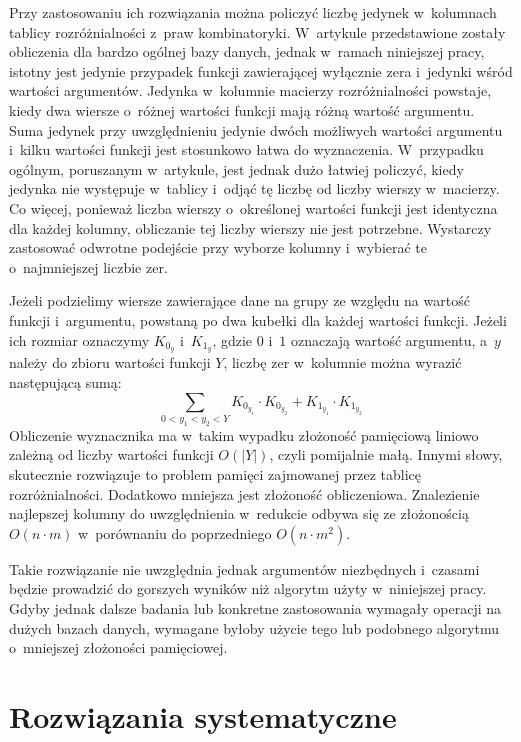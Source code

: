 Przy zastosowaniu ich rozwiązania można policzyć liczbę jedynek w~kolumnach tablicy rozróżnialności z~praw kombinatoryki.
W~artykule przedstawione zostały obliczenia dla bardzo ogólnej bazy danych,
jednak w~ramach niniejszej pracy,
istotny jest jedynie przypadek funkcji zawierającej wyłącznie zera i~jedynki wśród wartości argumentów.
Jedynka w~kolumnie macierzy rozróżnialności powstaje,
kiedy dwa wiersze o~różnej wartości funkcji mają różną wartość argumentu.
Suma jedynek przy uwzględnieniu jedynie dwóch możliwych wartości argumentu i~kilku wartości funkcji jest stosunkowo łatwa do wyznaczenia.
W~przypadku ogólnym,
poruszanym w~artykule,
jest jednak dużo łatwiej policzyć,
kiedy jedynka nie występuje w~tablicy i~odjąć tę liczbę od liczby wierszy w~macierzy.
Co więcej,
ponieważ liczba wierszy o~określonej wartości funkcji jest identyczna dla każdej kolumny,
obliczanie tej liczby wierszy nie jest potrzebne.
Wystarczy zastosować odwrotne podejście przy wyborze kolumny i~wybierać te o~najmniejszej liczbie zer.

Jeżeli podzielimy wiersze zawierające dane na grupy ze względu na wartość funkcji i~argumentu,
powstaną po dwa kubełki dla każdej wartości funkcji.
Jeżeli ich rozmiar oznaczymy $K_{0_y}$ i~$K_{1_y}$,
 gdzie $0$ i~$1$ oznaczają wartość argumentu,
a~$y$ należy do zbioru wartości funkcji $Y$,
liczbę zer w~kolumnie można wyrazić następującą sumą:
\begin{equation}
\sum_{0<y_1<y_2<Y} K_{0_{y_1}} \cdot K_{0_{y_2}} + K_{1_{y_1}} \cdot K_{1_{y_2}}
\end{equation}
Obliczenie wyznacznika ma w~takim wypadku złożoność pamięciową liniowo zależną od liczby wartości funkcji $O(\left\vert{Y}\right\vert)$,
czyli pomijalnie małą.
Innymi słowy, skutecznie rozwiązuje to problem pamięci zajmowanej przez tablicę rozróżnialności.
Dodatkowo mniejsza jest złożoność obliczeniowa.
Znalezienie najlepszej kolumny do uwzględnienia w~redukcie odbywa się ze złożonością $O(n \cdot m)$ w~porównaniu do poprzedniego $O(n \cdot m^2)$.

Takie rozwiązanie nie uwzględnia jednak argumentów niezbędnych i~czasami będzie prowadzić do gorszych wyników niż algorytm użyty w~niniejszej pracy.
Gdyby jednak dalsze badania lub konkretne zastosowania wymagały operacji na dużych bazach danych,
wymagane byłoby użycie tego lub podobnego algorytmu o~mniejszej złożoności pamięciowej.

\section{Rozwiązania systematyczne}

